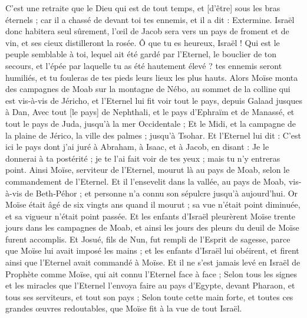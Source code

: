 \begin{multicols}{2}
C'est une retraite que le Dieu qui est de tout temps, et [d'être] sous les bras éternels ; car il a chassé de devant toi tes ennemis, et il a dit : Extermine.
Israël donc habitera seul sûrement, l'œil de Jacob sera vers un pays de froment et de vin, et ses cieux distilleront la rosée.
Ô que tu es heureux, Israël ! Qui est le peuple semblable à toi, lequel ait été gardé par l'Eternel, le bouclier de ton secours, et l'épée par laquelle tu as été hautement élevé ? tes ennemis seront humiliés, et tu fouleras de tes pieds leurs lieux les plus hauts.
\VerseOne{}Alors Moïse monta des campagnes de Moab sur la montagne de Nébo, au sommet de la colline qui est vis-à-vis de Jéricho, et l'Eternel lui fit voir tout le pays, depuis Galaad jusques à Dan,
Avec tout [le pays] de Nephthali, et le pays d'Ephraïm et de Manassé, et tout le pays de Juda, jusqu'à la mer Occidentale ;
Et le Midi, et la campagne de la plaine de Jérico, la ville des palmes ; jusqu'à Tsohar.
Et l'Eternel lui dit : C'est ici le pays dont j'ai juré à Abraham, à Isaac, et à Jacob, en disant : Je le donnerai à ta postérité ; je te l'ai fait voir de tes yeux ; mais tu n'y entreras point.
Ainsi Moïse, serviteur de l'Eternel, mourut là au pays de Moab, selon le commandement de l'Eternel.
Et il l'ensevelit dans la vallée, au pays de Moab, vis-à-vis de Beth-Péhor ; et personne n'a connu son sépulcre jusqu'à aujourd'hui.
Or Moïse était âgé de six vingts ans quand il mourut ; sa vue n'était point diminuée, et sa vigueur n'était point passée.
Et les enfants d'Israël pleurèrent Moïse trente jours dans les campagnes de Moab, et ainsi les jours des pleurs du deuil de Moïse furent accomplis.
Et Josué, fils de Nun, fut rempli de l'Esprit de sagesse, parce que Moïse lui avait imposé les mains ; et les enfants d'Israël lui obéirent, et firent ainsi que l'Eternel avait commandé à Moïse.
Et il ne s'est jamais levé en Israël de Prophète comme Moïse, qui ait connu l'Eternel face à face ;
Selon tous les signes et les miracles que l'Eternel l'envoya faire au pays d'Egypte, devant Pharaon, et tous ses serviteurs, et tout son pays ;
Selon toute cette main forte, et toutes ces grandes œuvres redoutables, que Moïse fit à la vue de tout Israël.
\PPE{}
\end{multicols}
